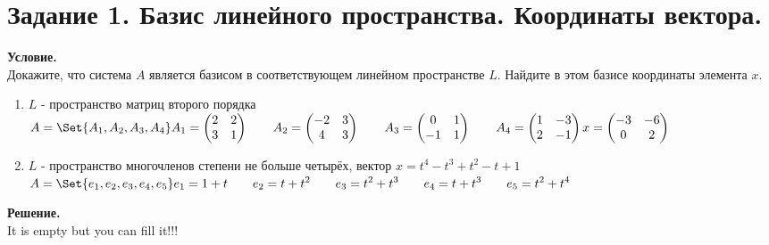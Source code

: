 \section{Задание 1. Базис линейного пространства. Координаты вектора.}

\textbf{Условие.}\\
Докажите, что система $A$ является базисом в соответствующем линейном пространстве $L$.
Найдите в этом базисе координаты элемента $x$.

\begin{enumerate}
    \item $L$ - пространство матриц второго порядка\\
    $\displaystyle A = \Set{A_1, A_2, A_3, A_4}\\
    A_1 = \begin{pmatrix}2 & 2 \\ 3 & 1\end{pmatrix}\qquad
    A_2 = \begin{pmatrix}-2 & 3 \\ 4 & 3\end{pmatrix}\qquad
    A_3 = \begin{pmatrix}0 & 1 \\ -1 & 1\end{pmatrix}\qquad
    A_4 = \begin{pmatrix}1 & -3 \\ 2 & -1\end{pmatrix}\\
    x = \begin{pmatrix}-3 & -6 \\ 0 & 2\end{pmatrix}$
    \item $L$ - пространство многочленов степени не больше четырёх, вектор $x = t^4 - t^3 + t^2 - t + 1$\\
    $\displaystyle A = \Set{e_1, e_2, e_3, e_4, e_5}\\
    e_1 = 1 + t\qquad
    e_2 = t + t^2\qquad
    e_3 = t^2 + t^3\qquad
    e_4 = t + t^3\qquad
    e_5 = t^2 + t^4\qquad$
\end{enumerate}
\vspace{10mm}
\noindent\textbf{Решение.}\\
It is empty but you can fill it!!!

\clearpage